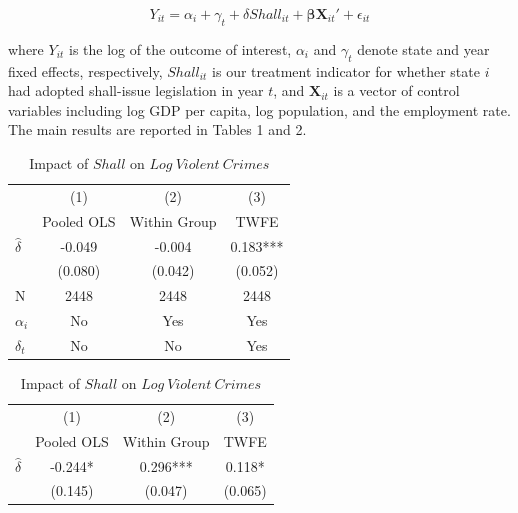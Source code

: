 \documentclass{article}
\begin{document}
\begin{equation*}
    Y_{it} = \alpha_i + \gamma_t + {\delta} Shall_{it} + \mathbf{{\beta}}\textbf{X}_{it}'+\epsilon_{it}
\end{equation*}
    
where $Y_{it}$ is the log of the outcome of interest, $\alpha_i$ and $\gamma_t$ denote state and year fixed effects, respectively, $Shall_{it}$ is our treatment indicator for whether state $i$ had adopted shall-issue legislation in year $t$, and $\textbf{X}_{it}$ is a vector of control variables including log GDP per capita, log population, and the employment rate.\\

The main results are reported in Tables 1 and 2.\\


\begin{center}
    \begin{table}[hbtp!]
\parbox{.45\linewidth}{
\centering
\caption{Impact of $Shall$ on $Log~Property~Crimes$}
\begin{tabular}{l|c|c|c|}
                      & (1)     & (2)     & (3)     \\  & Pooled OLS     &  Within Group     & TWFE        \\ \hline
$\widehat{\delta}$  & -0.049 & -0.004 & 0.183***  \\
\multicolumn{1}{c|}{} & (0.080) & (0.042)  & (0.052) \\ \hline
N                        & 2448    & 2448     & 2448        \\
$\alpha_i$                 & No       & Yes        & Yes             \\
$\delta_t$                  & No       & No        & Yes         \\
\hline   
\end{tabular}
}
\hfill
\parbox{.45\linewidth}{
\centering
\caption{Impact of $Shall$ on $Log~Violent~Crimes$}
\begin{tabular}{l|c|c|c|}
                      & (1)     & (2)     & (3)         \\  & Pooled OLS     &  Within Group    & TWFE         \\ \hline
$\widehat{\delta}$                 & -0.244* & 0.296*** & 0.118* \\
\multicolumn{1}{c|}{} & (0.145) & (0.047)  & (0.065)   \\ \hline

\end{tabular}}
\end{table}
\end{center}
\end{document}
